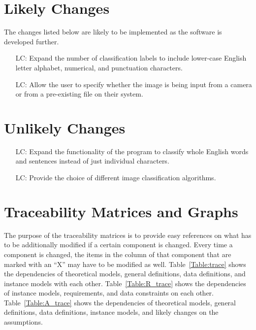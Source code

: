 \documentclass[12pt]{article}
\newcounter{lcnum} %
\begin{document}
\section{Likely Changes}

The changes listed below are likely to be implemented as the software is developed further.

\noindent \begin{itemize}

\item[LC\refstepcounter{lcnum}\thelcnum\label{LC1}:] Expand the number of classification labels
to include lower-case English letter alphabet, numerical, and punctuation characters. 
\item[LC\refstepcounter{lcnum}\thelcnum\label{LC2}:] Allow the user to specify whether the image is being
input from a camera or from a pre-existing file on their system.

\end{itemize}

\section{Unlikely Changes}    

\noindent \begin{itemize}

\item[LC\refstepcounter{lcnum}\thelcnum\label{LC3}:] Expand the functionality of the program to classify
whole English words and sentences instead of just individual characters.
\item[LC\refstepcounter{lcnum}\thelcnum\label{LC4}:] Provide the choice of different image classification algorithms.


\end{itemize}

\section{Traceability Matrices and Graphs}

The purpose of the traceability matrices is to provide easy references on what
has to be additionally modified if a certain component is changed.  Every time a
component is changed, the items in the column of that component that are marked
with an ``X'' may have to be modified as well.  Table~\ref{Table:trace} shows the
dependencies of theoretical models, general definitions, data definitions, and
instance models with each other. Table~\ref{Table:R_trace} shows the
dependencies of instance models, requirements, and data constraints on each
other. Table~\ref{Table:A_trace} shows the dependencies of theoretical models,
general definitions, data definitions, instance models, and likely changes on
the assumptions.
\end{document}
